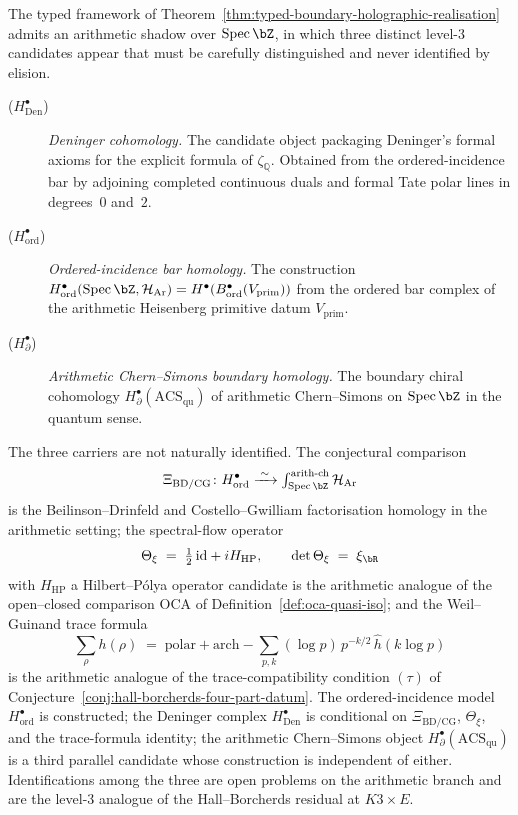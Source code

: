 \begin{remark}
\label{rem:three-deninger-objects}
The typed framework of Theorem~\ref{thm:typed-boundary-holographic-realisation} admits an arithmetic shadow over $\mathrm{Spec}\,\bZ$, in which three distinct level-$3$ candidates appear that must be carefully distinguished and never identified by elision.
\begin{description}
 \item[\textup{($H^\bullet_{\mathrm{Den}}$)}] \emph{Deninger cohomology.} The candidate object packaging Deninger's formal axioms for the explicit formula of $\zeta_{\mathbb{Q}}$. Obtained from the ordered-incidence bar by adjoining completed continuous duals and formal Tate polar lines in degrees~$0$ and~$2$.
 \item[\textup{($H^\bullet_{\mathrm{ord}}$)}] \emph{Ordered-incidence bar homology.} The construction $H^\bullet_{\mathrm{ord}}(\mathrm{Spec}\,\bZ, \mathcal{H}_{\mathrm{Ar}}) = H^\bullet(B^\bullet_{\mathrm{ord}}(V_{\mathrm{prim}}))$ from the ordered bar complex of the arithmetic Heisenberg primitive datum $V_{\mathrm{prim}}$.
 \item[\textup{($H^\bullet_\partial$)}] \emph{Arithmetic Chern--Simons boundary homology.} The boundary chiral cohomology $H^\bullet_\partial(\mathrm{ACS}_{\mathrm{qu}})$ of arithmetic Chern--Simons on $\mathrm{Spec}\,\bZ$ in the quantum sense.
\end{description}
The three carriers are not naturally identified. The conjectural comparison
\[
 \Xi_{\mathrm{BD}/\mathrm{CG}}\colon H^\bullet_{\mathrm{ord}} \xrightarrow{\;\sim\;} \textstyle\int^{\mathrm{arith}\text{-}\mathrm{ch}}_{\mathrm{Spec}\,\bZ} \mathcal{H}_{\mathrm{Ar}}
\]
is the Beilinson--Drinfeld and Costello--Gwilliam factorisation homology in the arithmetic setting; the spectral-flow operator
\[
 \Theta_\xi \;=\; \tfrac{1}{2}\,\mathrm{id} + iH_{\mathrm{HP}}, \qquad \det \Theta_\xi \;=\; \xi_{\bR}
\]
with $H_{\mathrm{HP}}$ a Hilbert--P\'olya operator candidate is the arithmetic analogue of the open--closed comparison $\mathrm{OCA}$ of Definition~\ref{def:oca-quasi-iso}; and the Weil--Guinand trace formula
\[
 \sum_\rho h(\rho)
 \;=\;
 \mathrm{polar} + \mathrm{arch} - \sum_{p, k} (\log p)\, p^{-k/2}\, \hat h(k \log p)
\]
is the arithmetic analogue of the trace-compatibility condition $(\tau)$ of Conjecture~\ref{conj:hall-borcherds-four-part-datum}. The ordered-incidence model $H^\bullet_{\mathrm{ord}}$ is constructed; the Deninger complex $H^\bullet_{\mathrm{Den}}$ is conditional on $\Xi_{\mathrm{BD}/\mathrm{CG}}$, $\Theta_\xi$, and the trace-formula identity; the arithmetic Chern--Simons object $H^\bullet_\partial(\mathrm{ACS}_{\mathrm{qu}})$ is a third parallel candidate whose construction is independent of either. Identifications among the three are open problems on the arithmetic branch and are the level-$3$ analogue of the Hall--Borcherds residual at $K3 \times E$.
\end{remark}

